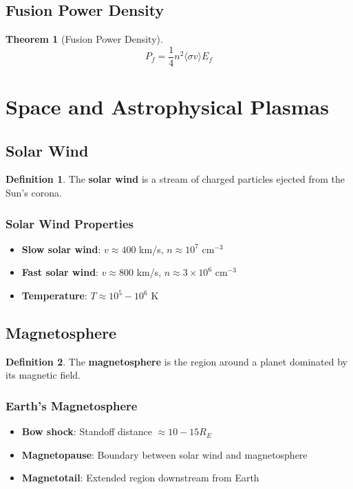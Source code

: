 \documentclass[11pt]{article}
\theoremstyle{definition}
\newtheorem{definition}{Definition}[section]
\newtheorem{theorem}{Theorem}[section]
\begin{document}
\subsection{Fusion Power Density}
\begin{theorem}[Fusion Power Density]
$$P_f = \frac{1}{4}n^2 \langle \sigma v \rangle E_f$$
\end{theorem}

\section{Space and Astrophysical Plasmas}

\subsection{Solar Wind}
\begin{definition}
The \textbf{solar wind} is a stream of charged particles ejected from the Sun's corona.
\end{definition}

\subsubsection{Solar Wind Properties}
\begin{itemize}
    \item \textbf{Slow solar wind}: $v \approx 400$ km/s, $n \approx 10^7$ cm$^{-3}$
    \item \textbf{Fast solar wind}: $v \approx 800$ km/s, $n \approx 3 \times 10^6$ cm$^{-3}$
    \item \textbf{Temperature}: $T \approx 10^5 - 10^6$ K
\end{itemize}

\subsection{Magnetosphere}
\begin{definition}
The \textbf{magnetosphere} is the region around a planet dominated by its magnetic field.
\end{definition}

\subsubsection{Earth's Magnetosphere}
\begin{itemize}
    \item \textbf{Bow shock}: Standoff distance $\approx 10-15 R_E$
    \item \textbf{Magnetopause}: Boundary between solar wind and magnetosphere
    \item \textbf{Magnetotail}: Extended region downstream from Earth
\end{itemize}
\end{document}
